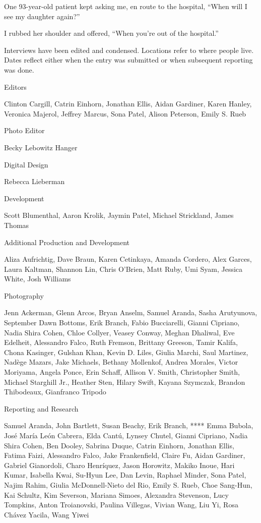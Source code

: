 One 93-year-old patient kept asking me, en route to the hospital, ``When
will I see my daughter again?''

I rubbed her shoulder and offered, ``When you're out of the hospital.''

Interviews have been edited and condensed. Locations refer to where
people live. Dates reflect either when the entry was submitted or when
subsequent reporting was done.

Editors

Clinton Cargill, Catrin Einhorn, Jonathan Ellis, Aidan Gardiner, Karen
Hanley, Veronica Majerol, Jeffrey Marcus, Sona Patel, Alison Peterson,
Emily S. Rueb

Photo Editor

Becky Lebowitz Hanger

Digital Design

Rebecca Lieberman

Development

Scott Blumenthal, Aaron Krolik, Jaymin Patel, Michael Strickland, James
Thomas

Additional Production and Development

Aliza Aufrichtig, Dave Braun, Karen Cetinkaya, Amanda Cordero, Alex
Garces, Laura Kaltman, Shannon Lin, Chris O'Brien, Matt Ruby, Umi Syam,
Jessica White, Josh Williams

Photography

Jenn Ackerman, Glenn Arcos, Bryan Anselm, Samuel Aranda, Sasha
Arutyunova, September Dawn Bottoms, Erik Branch, Fabio Bucciarelli,
Gianni Cipriano, Nadia Shira Cohen, Chloe Collyer, Veasey Conway, Meghan
Dhaliwal, Eve Edelheit, Alessandro Falco, Ruth Fremson, Brittany
Greeson, Tamir Kalifa, Chona Kasinger, Gulshan Khan, Kevin D. Liles,
Giulia Marchi, Saul Martinez, Nadège Mazars, Jake Michaels, Bethany
Mollenkof, Andrea Morales, Victor Moriyama, Angela Ponce, Erin Schaff,
Allison V. Smith, Christopher Smith, Michael Starghill Jr., Heather
Sten, Hilary Swift, Kayana Szymczak, Brandon Thibodeaux, Gianfranco
Tripodo

Reporting and Research

Samuel Aranda, John Bartlett, Susan Beachy, Erik Branch, **** Emma
Bubola, José María León Cabrera, Elda Cantú, Lynsey Chutel, Gianni
Cipriano, Nadia Shira Cohen, Ben Dooley, Sabrina Duque, Catrin Einhorn,
Jonathan Ellis, Fatima Faizi, Alessandro Falco, Jake Frankenfield,
Claire Fu, Aidan Gardiner, Gabriel Gianordoli, Charo Henríquez, Jason
Horowitz, Makiko Inoue, Hari Kumar, Isabella Kwai, Su-Hyun Lee, Dan
Levin, Raphael Minder, Sona Patel, Najim Rahim, Giulia McDonnell-Nieto
del Rio, Emily S. Rueb, Choe Sang-Hun, Kai Schultz, Kim Severson,
Mariana Simoes, Alexandra Stevenson, Lucy Tompkins, Anton Troianovski,
Paulina Villegas, Vivian Wang, Liu Yi, Rosa Chávez Yacila, Wang Yiwei

